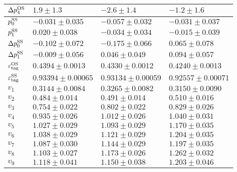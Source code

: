 \begin{table}
\begin{tabular}{llll}
      $\Delta p_{4}^{\rm OS}$       & $1.9\pm1.3$           & $-2.6\pm1.4$          & $-1.2\pm1.6$       \\  
      \midrule
      $p_{0}^{\rm SS}$             & $-0.031\pm0.035$      & $-0.057\pm0.032$      & $-0.031\pm0.037$   \\   
      $p_{1}^{\rm SS}$             & $0.020\pm0.038$       & $-0.034\pm0.034$      & $-0.015\pm0.039$   \\  
      $\Delta p_{0}^{\rm SS}$       & $-0.102\pm0.072$      & $-0.175\pm0.066$      & $0.065\pm0.078$    \\    
      $\Delta p_{1}^{\rm SS}$       & $-0.009\pm0.056$      & $0.046\pm0.049$       & $0.094\pm0.057$    \\ 
      \midrule
      $\varepsilon_{\rm tag}^{\rm OS}$ & $0.4394\pm0.0013$     & $0.4330\pm0.0012$     & $0.4240\pm0.0013$  \\     
      $\varepsilon_{\rm tag}^{\rm SS}$ & $0.93394\pm0.00065$   & $0.93134\pm0.00059$   & $0.92557\pm0.00071$ \\
      \midrule
      $v_{1}$               & $0.3144\pm0.0084$     & $0.3265\pm0.0082$     & $0.3150\pm0.0090$  \\   
      $v_{2}$               & $0.484\pm0.014$       & $0.491\pm0.014$       & $0.510\pm0.016$    \\   
      $v_{3}$               & $0.754\pm0.022$       & $0.802\pm0.022$       & $0.829\pm0.026$    \\   
      $v_{4}$               & $0.935\pm0.026$       & $1.012\pm0.026$       & $1.040\pm0.031$    \\   
      $v_{5}$               & $1.027\pm0.029$       & $1.093\pm0.029$       & $1.170\pm0.035$    \\   
      $v_{6}$               & $1.038\pm0.029$       & $1.121\pm0.029$       & $1.204\pm0.035$    \\   
      $v_{7}$               & $1.087\pm0.030$       & $1.144\pm0.029$       & $1.197\pm0.035$    \\   
      $v_{8}$               & $1.103\pm0.027$       & $1.173\pm0.026$       & $1.262\pm0.032$    \\   
      $v_{9}$               & $1.118\pm0.041$       & $1.150\pm0.038$       & $1.203\pm0.046$    \\    
\bottomrule
  \end{tabular}
\end{table}

